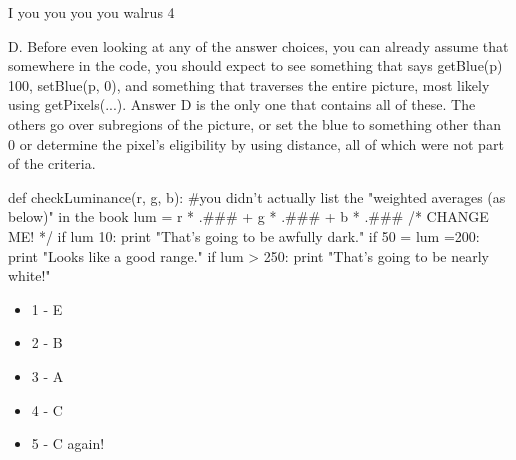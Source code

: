 \begin{exercises}
\begin{ex}
\begin{itemize}
\end{itemize}
\end{ex}


\begin{ex}
\begin{example}
I
you
you
you
you
walrus
4
\end{example}
\end{ex}

\begin{ex}
D. Before even looking at any of the answer choices, you can already assume
that somewhere in the code, you should expect to see something that says
getBlue(p) 100, setBlue(p, 0), and something that traverses the entire
picture, most likely using getPixels(...). Answer D is the only one that
contains all of these. The others go over subregions of the picture, or set
the blue to something other than 0 or determine the pixel's eligibility by
using distance, all of which were not part of the criteria.
\end{ex}


\begin{ex}
\begin{example}
def checkLuminance(r, g, b):
  #you didn't actually list the "weighted averages (as below)" in the book
  lum = r * .### + g * .### + b * .### /* CHANGE ME! */
  if lum 10:
    print "That's going to be awfully dark."
  if 50 = lum =200:
    print "Looks like a good range."
  if lum > 250:
    print "That's going to be nearly white!"
\end{example}

\end{ex}



%






%




\begin{ex}
\begin{itemize}
\item 1 - E
\item 2 - B
\item 3 - A
\item 4 - C
\item 5 - C again!


\end{itemize}
\end{ex}
\end{exercises}
